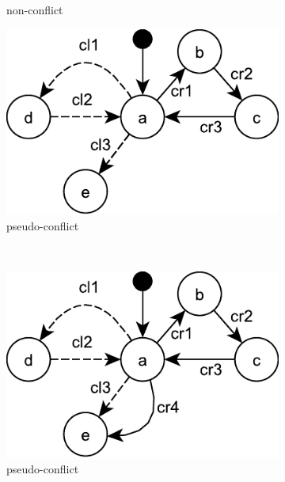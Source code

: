 \begin{figure}[ht]
\begin{subfigure}[t]{0.48\linewidth}
    \caption{non-conflict}
    \label{fig:statechart_03}
  \end{subfigure}
  \hfill
  \begin{subfigure}[t]{0.48\linewidth}
    \includegraphics[width=\linewidth]{statechart_04}
    \caption{pseudo-conflict}
    \label{fig:statechart_04}
  \end{subfigure}
  \\
  \begin{subfigure}[t]{0.48\linewidth}
    \includegraphics[width=\linewidth]{statechart_05}
    \caption{pseudo-conflict}
    \label{fig:statechart_05}
  \end{subfigure}
  \hfill
  \begin{subfigure}[t]{0.48\linewidth}

\end{subfigure}
\end{figure}

